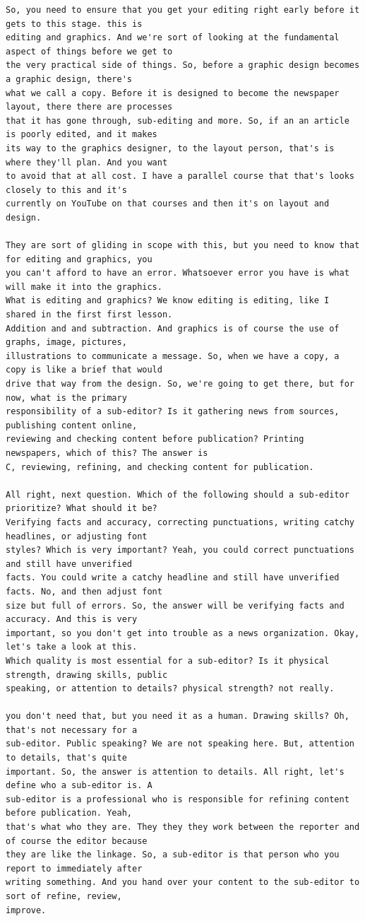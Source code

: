 {\begin{Verbatim}
So, you need to ensure that you get your editing right early before it gets to this stage. this is
editing and graphics. And we're sort of looking at the fundamental aspect of things before we get to
the very practical side of things. So, before a graphic design becomes a graphic design, there's
what we call a copy. Before it is designed to become the newspaper layout, there there are processes
that it has gone through, sub-editing and more. So, if an an article is poorly edited, and it makes
its way to the graphics designer, to the layout person, that's is where they'll plan. And you want
to avoid that at all cost. I have a parallel course that that's looks closely to this and it's
currently on YouTube on that courses and then it's on layout and design.

They are sort of gliding in scope with this, but you need to know that for editing and graphics, you
you can't afford to have an error. Whatsoever error you have is what will make it into the graphics.
What is editing and graphics? We know editing is editing, like I shared in the first first lesson.
Addition and and subtraction. And graphics is of course the use of graphs, image, pictures,
illustrations to communicate a message. So, when we have a copy, a copy is like a brief that would
drive that way from the design. So, we're going to get there, but for now, what is the primary
responsibility of a sub-editor? Is it gathering news from sources, publishing content online,
reviewing and checking content before publication? Printing newspapers, which of this? The answer is
C, reviewing, refining, and checking content for publication.

All right, next question. Which of the following should a sub-editor prioritize? What should it be?
Verifying facts and accuracy, correcting punctuations, writing catchy headlines, or adjusting font
styles? Which is very important? Yeah, you could correct punctuations and still have unverified
facts. You could write a catchy headline and still have unverified facts. No, and then adjust font
size but full of errors. So, the answer will be verifying facts and accuracy. And this is very
important, so you don't get into trouble as a news organization. Okay, let's take a look at this.
Which quality is most essential for a sub-editor? Is it physical strength, drawing skills, public
speaking, or attention to details? physical strength? not really.

you don't need that, but you need it as a human. Drawing skills? Oh, that's not necessary for a
sub-editor. Public speaking? We are not speaking here. But, attention to details, that's quite
important. So, the answer is attention to details. All right, let's define who a sub-editor is. A
sub-editor is a professional who is responsible for refining content before publication. Yeah,
that's what who they are. They they they work between the reporter and of course the editor because
they are like the linkage. So, a sub-editor is that person who you report to immediately after
writing something. And you hand over your content to the sub-editor to sort of refine, review,
improve.


\end{Verbatim}}
